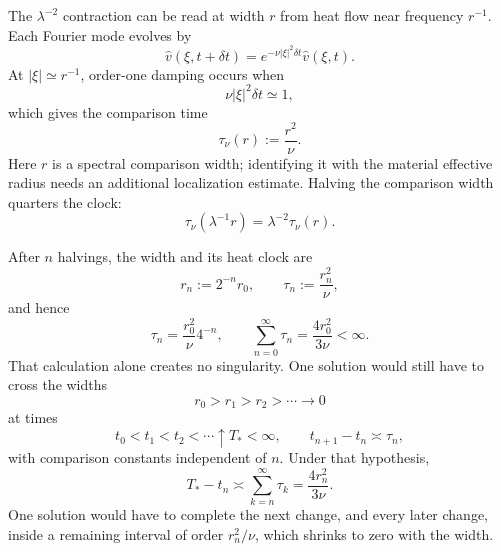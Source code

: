 
The \(\lambda^{-2}\) contraction can be read at width \(r\) from heat flow near frequency \(r^{-1}\). Each Fourier mode evolves by
\[
  \widehat v(\xi,t+\delta t)
  =
  e^{-\nu|\xi|^2\delta t}\widehat v(\xi,t).
\]
At \(|\xi|\simeq r^{-1}\), order-one damping occurs when
\[
  \nu|\xi|^2\delta t\simeq1,
\]
which gives the comparison time
\[
  \tau_\nu(r)
  :=
  \frac{r^2}{\nu}.
\]
Here \(r\) is a spectral comparison width; identifying it with the material effective radius needs an additional localization estimate. Halving the comparison width quarters the clock:
\[
  \tau_\nu(\lambda^{-1}r)
  =
  \lambda^{-2}\tau_\nu(r).
\]


After \(n\) halvings, the width and its heat clock are
\[
  r_n:=2^{-n}r_0,
  \qquad
  \tau_n:=\frac{r_n^2}{\nu},
\]
and hence
\[
  \tau_n
  =
  \frac{r_0^2}{\nu}4^{-n},
  \qquad
  \sum_{n=0}^{\infty}\tau_n
  =
  \frac{4r_0^2}{3\nu}
  <
  \infty.
\]
That calculation alone creates no singularity. One \NavierStokes{} solution would still have to cross the widths
\[
  r_0>r_1>r_2>\cdots\longrightarrow0
\]
at times
\[
  t_0<t_1<t_2<\cdots\uparrow T_*<\infty,
  \qquad
  t_{n+1}-t_n\asymp\tau_n,
\]
with comparison constants independent of \(n\). Under that hypothesis,
\[
  T_*-t_n
  \asymp
  \sum_{k=n}^{\infty}\tau_k
  =
  \frac{4r_n^2}{3\nu}.
\]
One solution would have to complete the next change, and every later change, inside a remaining interval of order \(r_n^2/\nu\), which shrinks to zero with the width.
